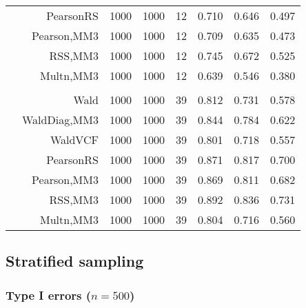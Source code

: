 \documentclass[
]{article}
\begin{document}
\begin{table}[H]
{\begin{tabular}[t]{lrrrrrrr}
\hspace{1em} & PearsonRS & 1000 & 1000 & 12 & 0.710 & 0.646 & 0.497\\

\hspace{1em} & Pearson,MM3 & 1000 & 1000 & 12 & 0.709 & 0.635 & 0.473\\

\hspace{1em} & RSS,MM3 & 1000 & 1000 & 12 & 0.745 & 0.672 & 0.525\\

\hspace{1em} & Multn,MM3 & 1000 & 1000 & 12 & 0.639 & 0.546 & 0.380\\
\cmidrule{1-8}
\addlinespace[0.3em]
\multicolumn{8}{l}{\textbf{3F 15V}}\\
\hspace{1em} & Wald & 1000 & 1000 & 39 & 0.812 & 0.731 & 0.578\\

\hspace{1em} & WaldDiag,MM3 & 1000 & 1000 & 39 & 0.844 & 0.784 & 0.622\\

\hspace{1em} & WaldVCF & 1000 & 1000 & 39 & 0.801 & 0.718 & 0.557\\

\hspace{1em} & PearsonRS & 1000 & 1000 & 39 & 0.871 & 0.817 & 0.700\\

\hspace{1em} & Pearson,MM3 & 1000 & 1000 & 39 & 0.869 & 0.811 & 0.682\\

\hspace{1em} & RSS,MM3 & 1000 & 1000 & 39 & 0.892 & 0.836 & 0.731\\

\hspace{1em} & Multn,MM3 & 1000 & 1000 & 39 & 0.804 & 0.716 & 0.560\\
\bottomrule
\end{tabular}}
\endgroup{}
\end{table}

\hypertarget{stratified-sampling}{%
\subsection{Stratified sampling}\label{stratified-sampling}}

\hypertarget{type-i-errors-n500-1}{%
\subsubsection{\texorpdfstring{Type I errors
(\(n=500\))}{Type I errors (n=500)}}\label{type-i-errors-n500-1}}
\end{document}
